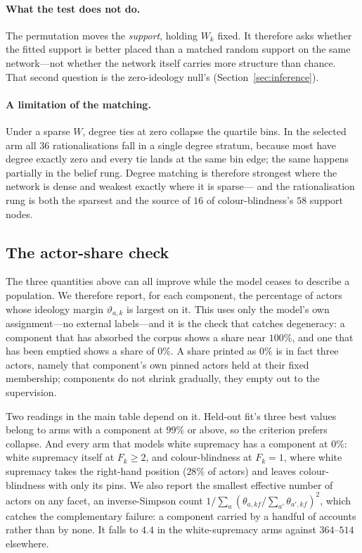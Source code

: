 \paragraph{What the test does not do.} The permutation moves the \emph{support}, holding
$W_k$ fixed. It therefore asks whether the fitted support is better placed than a matched
random support on the same network---not whether the network itself carries more
structure than chance. That second question is the zero-ideology null's
(Section~\ref{sec:inference}).

\paragraph{A limitation of the matching.} Under a sparse $W$, degree ties at zero
collapse the quartile bins. In the selected arm all $36$ rationalisations fall in a
single degree stratum, because most have degree exactly zero and every tie lands at the
same bin edge; the same happens partially in the belief rung. Degree matching is
therefore strongest where the network is dense and weakest exactly where it is sparse---
and the rationalisation rung is both the sparsest and the source of $16$ of
colour-blindness's $58$ support nodes.

\subsection{The actor-share check}\label{app:share}

The three quantities above can all improve while the model ceases to describe a
population. We therefore report, for each component, the percentage of actors whose
ideology margin $\vartheta_{a,k}$ is largest on it. This uses only the model's own
assignment---no external labels---and it is the check that catches degeneracy: a
component that has absorbed the corpus shows a share near $100\%$, and one that has been
emptied shows a share of $0\%$. A share printed as $0\%$ is in fact three actors, namely
that component's own pinned actors held at their fixed membership; components do not
shrink gradually, they empty out to the supervision.

Two readings in the main table depend on it. Held-out fit's three best values belong to
arms with a component at $99\%$ or above, so the criterion prefers collapse. And every
arm that models white supremacy has a component at $0\%$: white supremacy itself at
$F_k\ge2$, and colour-blindness at $F_k=1$, where white supremacy takes the right-hand
position ($28\%$ of actors) and leaves colour-blindness with only its pins. We also
report the smallest effective number of actors on any facet, an inverse-Simpson count
$1/\sum_a(\theta_{a,kf}/\sum_{a'}\theta_{a',kf})^2$, which catches the complementary
failure: a component carried by a handful of accounts rather than by none. It falls to
$4.4$ in the white-supremacy arms against $364$--$514$ elsewhere.
